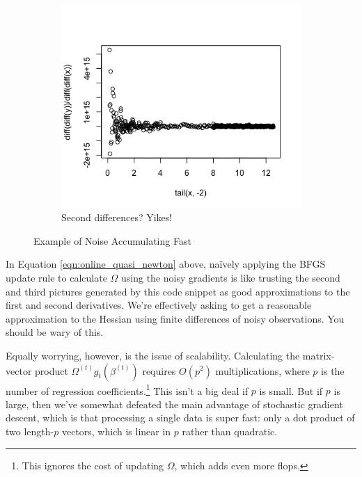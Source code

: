 \documentclass[11 pt]{article}
\begin{document}
\begin{figure}[H]
\begin{center}
\begin{subfigure}[h]{0.35\linewidth}
		\end{subfigure}
		\begin{subfigure}[h]{0.35\linewidth}
			\includegraphics[width=\linewidth]{R_Code/Fig/P1F3.png}
			\caption{Second differences? Yikes!}
		\end{subfigure}
		\caption{Example of Noise Accumulating Fast}
		\label{fig:Fig1}
	\end{center}
\end{figure}


In Equation \ref{eqn:online_quasi_newton} above, na\"ively applying the BFGS update rule to calculate $\Omega$ using the noisy gradients is like trusting the second and third pictures generated by this code snippet as good approximations to the first and second derivatives.  We're effectively asking to get a reasonable approximation to the Hessian using finite differences of noisy observations.  You should be wary of this.

Equally worrying, however, is the issue of scalability.  Calculating the matrix-vector product $\Omega^{(t)} g_t(\beta^{(t)})$ requires $O(p^2)$ multiplications, where $p$ is the number of regression coefficients.\footnote{This ignores the cost of updating $\Omega$, which adds even more flops.}  This isn't a big deal if $p$ is small.  But if $p$ is large, then we've somewhat defeated the main advantage of stochastic gradient descent, which is that processing a single data is super fast: only a dot product of two length-$p$ vectors, which is linear in $p$ rather than quadratic.
\end{document}
